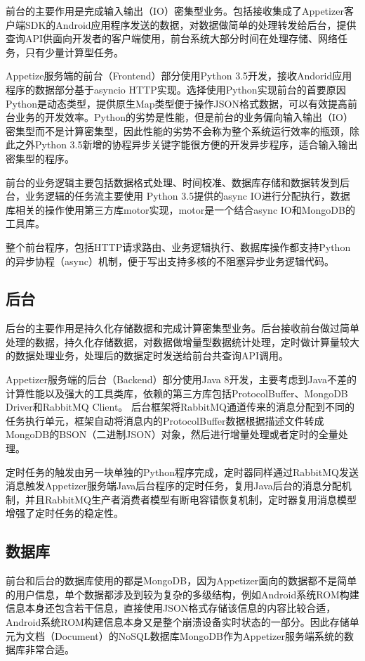 前台的主要作用是完成输入输出（IO）密集型业务。包括接收集成了Appetizer客户端SDK的Android应用程序发送的数据，对数据做简单的处理转发给后台，提供查询API供面向开发者的客户端使用，前台系统大部分时间在处理存储、网络任务，只有少量计算型任务。

Appetize服务端的前台（Frontend）部分使用Python 3.5开发，接收Andorid应用程序的数据部分基于asyncio HTTP实现。选择使用Python实现前台的首要原因Python是动态类型，提供原生Map类型便于操作JSON格式数据，可以有效提高前台业务的开发效率。Python的劣势是性能，但是前台的业务偏向输入输出（IO）密集型而不是计算密集型，因此性能的劣势不会称为整个系统运行效率的瓶颈，除此之外Python 3.5新增的协程异步关键字能很方便的开发异步程序，适合输入输出密集型的程序。

前台的业务逻辑主要包括数据格式处理、时间校准、数据库存储和数据转发到后台，业务逻辑的任务流主要使用 Python 3.5提供的async IO进行分配执行，数据库相关的操作使用第三方库motor实现，motor是一个结合async IO和MongoDB的工具库。

整个前台程序，包括HTTP请求路由、业务逻辑执行、数据库操作都支持Python的异步协程（async）机制，便于写出支持多核的不阻塞异步业务逻辑代码。

\subsection{后台}
\label{subsec:serverBackend}

后台的主要作用是持久化存储数据和完成计算密集型业务。后台接收前台做过简单处理的数据，持久化存储数据，对数据做增量型数据统计处理，定时做计算量较大的数据处理业务，处理后的数据定时发送给前台共查询API调用。

Appetizer服务端的后台（Backend）部分使用Java 8开发，主要考虑到Java不差的计算性能以及强大的工具类库，依赖的第三方库包括ProtocolBuffer、MongoDB Driver和RabbitMQ Client。
后台框架将RabbitMQ通道传来的消息分配到不同的任务执行单元，框架自动将消息内的ProtocolBuffer数据根据描述文件转成MongoDB的BSON（二进制JSON）对象，然后进行增量处理或者定时的全量处理。

定时任务的触发由另一块单独的Python程序完成，定时器同样通过RabbitMQ发送消息触发Appetizer服务端Java后台程序的定时任务，复用Java后台的消息分配机制，并且RabbitMQ生产者消费者模型有断电容错恢复机制，定时器复用消息模型增强了定时任务的稳定性。

\subsection{数据库}
\label{subsec:database}

前台和后台的数据库使用的都是MongoDB，因为Appetizer面向的数据都不是简单的用户信息，单个数据都涉及到较为复杂的多级结构，例如Android系统ROM构建信息本身还包含若干信息，直接使用JSON格式存储该信息的内容比较合适，Android系统ROM构建信息本身又是整个崩溃设备实时状态的一部分。因此存储单元为文档（Document）的NoSQL数据库MongoDB作为Appetizer服务端系统的数据库非常合适。

